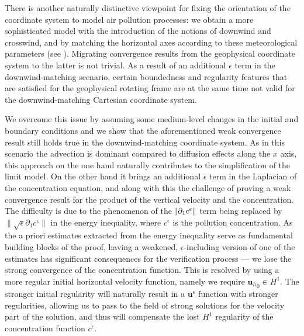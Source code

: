 \documentclass[12pt]{report}
\numberwithin{theorem}{chapter}
\numberwithin{corollary}{chapter}
\numberwithin{lemma}{chapter}
\numberwithin{remark}{chapter}
\numberwithin{definition}{chapter}
\numberwithin{prop}{chapter}
\begin{document}
There is another naturally distinctive viewpoint for fixing the orientation of the coordinate system to model air pollution processes: we obtain a more sophisticated model with the introduction of the notions of downwind and crosswind, and by matching the horizontal axes according to these meteorological parameters (see \cite{goyal2011mathematical}). Migrating convergence results from the geophysical coordinate system to the latter is not trivial. As a result of an additional $\epsilon$ term in the downwind-matching scenario, certain boundedness and regularity features that are satisfied for the geophysical rotating frame are at the same time not valid for the downwind-matching Cartesian coordinate system.

We overcome this issue by assuming some medium-level changes in the initial and boundary conditions and we show that the aforementioned weak convergence result still holds true in the downwind-matching coordinate system. As in this scenario the advection is dominant compared to diffusion effects along the $x$ axis, this approach on the one hand naturally contributes to the simplification of the limit model. On the other hand it brings an additional $\epsilon$ term in the Laplacian of the concentration equation, and along with this the challenge of proving a weak convergence result for the product of the vertical velocity and the concentration. The difficulty is due to the phenomenon of the $\norm{\partial_1 c^\epsilon}$ term being replaced by $\| \sqrt{\epsilon} \partial_1 c^\epsilon \|$ in the energy inequality, where $c^\epsilon$ is the pollution concentration. As the a priori estimates extracted from the energy inequality serve as fundamental building blocks of the proof, having a weakened, $\epsilon$-including version of one of the estimates has significant consequences for the verification process --- we lose the strong convergence of the concentration function. This is resolved by using a more regular initial horizontal velocity function, namely we require ${\mathbf{u}_h}_0 \in H^1.$ The stronger initial regularity will naturally result in a $\mathbf{u}^\epsilon$ function with stronger regularities, allowing us to pass to the field of strong solutions for the velocity part of the solution, and thus will compensate the lost $H^1$ regularity of the concentration function $c^\epsilon.$
\end{document}
